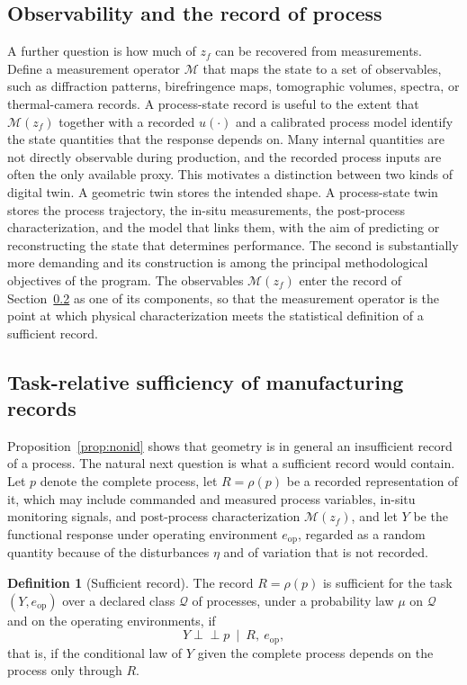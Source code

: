 \documentclass[11pt]{article}
\theoremstyle{definition}
\newtheorem{definition}{Definition}
\begin{document}
\subsection{Observability and the record of process}

A further question is how much of $z_f$ can be recovered from measurements. Define a measurement operator $\mathcal{M}$ that maps the state to a set of observables, such as diffraction patterns, birefringence maps, tomographic volumes, spectra, or thermal-camera records. A process-state record is useful to the extent that $\mathcal{M}(z_f)$ together with a recorded $u(\cdot)$ and a calibrated process model identify the state quantities that the response depends on. Many internal quantities are not directly observable during production, and the recorded process inputs are often the only available proxy. This motivates a distinction between two kinds of digital twin. A geometric twin stores the intended shape. A process-state twin stores the process trajectory, the in-situ measurements, the post-process characterization, and the model that links them, with the aim of predicting or reconstructing the state that determines performance. The second is substantially more demanding and its construction is among the principal methodological objectives of the program. The observables $\mathcal{M}(z_f)$ enter the record of Section~\ref{sec:suff} as one of its components, so that the measurement operator is the point at which physical characterization meets the statistical definition of a sufficient record.

\subsection{Task-relative sufficiency of manufacturing records}
\label{sec:suff}

Proposition~\ref{prop:nonid} shows that geometry is in general an insufficient record of a process. The natural next question is what a sufficient record would contain. Let $p$ denote the complete process, let $R=\rho(p)$ be a recorded representation of it, which may include commanded and measured process variables, in-situ monitoring signals, and post-process characterization $\mathcal{M}(z_f)$, and let $Y$ be the functional response under operating environment $e_{\mathrm{op}}$, regarded as a random quantity because of the disturbances $\eta$ and of variation that is not recorded.

\begin{definition}[Sufficient record]
The record $R=\rho(p)$ is sufficient for the task $(Y,e_{\mathrm{op}})$ over a declared class $\mathcal{Q}$ of processes, under a probability law $\mu$ on $\mathcal{Q}$ and on the operating environments, if
\begin{equation}
Y\perp\!\!\!\perp p\ \mid\ R,\ e_{\mathrm{op}},
\end{equation}
that is, if the conditional law of $Y$ given the complete process depends on the process only through $R$.
\end{definition}
\end{document}
